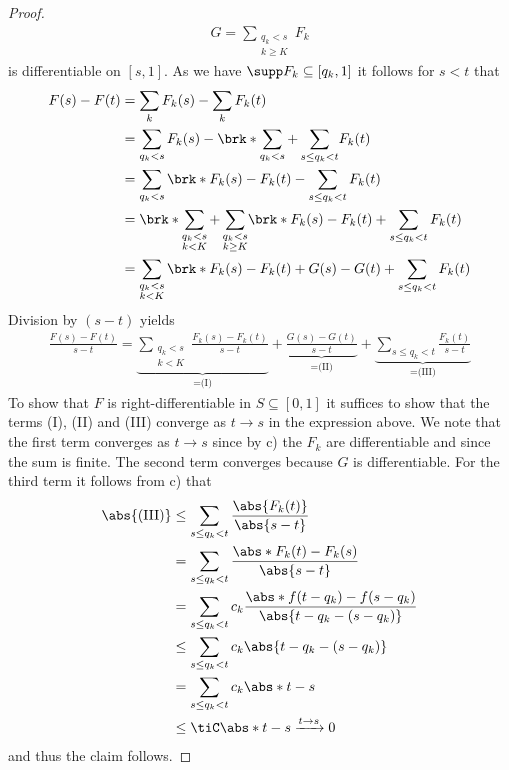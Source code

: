 \begin{proof}
\begin{align*}
	G=\sum_{\substack{q_k< s\\k\geq K}} F_k
\end{align*}
is differentiable on $[s,1]$.
As we have $\supp F_k\subseteq [q_k,1]$ it follows for $s< t$ that
\begin{align*}
	F(s)-F(t)
	&=\sum_kF_k(s)-\sum_kF_k(t) \\
	&=\sum_{q_k< s}F_k(s)-\brk*{\sum_{q_k<s}+\sum_{s\leq q_k <t}}F_k(t) \\
	&=\sum_{q_k< s}\brk*{F_k(s)-F_k(t)}-\sum_{s\leq q_k <t}F_k(t) \\
	&=\brk*{\sum_{\substack{q_k< s\\k< K}}+\sum_{\substack{q_k< s\\k\geq K}}}\brk*{F_k(s)-F_k(t)}+\sum_{s\leq q_k <t}F_k(t) \\
	&=\sum_{\substack{q_k< s\\k< K}}\brk*{F_k(s)-F_k(t)}+G(s)-G(t)+\sum_{s\leq q_k <t}F_k(t) \\
\end{align*}
Division by $(s-t)$ yields
\begin{align*}
	\frac{F(s)-F(t)}{s-t}
	=\underbrace{\sum_{\substack{q_k< s\\k< K}}\frac{F_k(s)-F_k(t)}{s-t}}_{=\text{(I)}}+\underbrace{\frac{G(s)-G(t)}{s-t}}_{=\text{(II)}}+\underbrace{\sum_{s\leq q_k <t}\frac{F_k(t)}{s-t}}_{=\text{(III)}}
\end{align*}
To show that $F$ is right-differentiable in $S\subseteq[0,1]$ it suffices to show that the terms (I), (II) and (III) converge as $t\to s$ in the expression above. 
We note that the first term converges as $t\to s$ since by c) the $F_k$ are differentiable and since the sum is finite.
The second term converges because $G$ is differentiable.
For the third term it follows from c) that
\begin{align*}
	\abs{\text{(III)}}&\leq\sum_{s\leq q_k <t}\frac{\abs{F_k(t)}}{\abs{s-t}} \\
	&=\sum_{s\leq q_k <t}\frac{\abs*{F_k(t)-F_k(s)}}{\abs{s-t}} \\
	&=\sum_{s\leq q_k <t}c_k\frac{\abs*{f(t-q_k)-f(s-q_k)}}{\abs{t-q_k-(s-q_k)}}	 \\
	&\leq\sum_{s\leq q_k <t}c_k\abs{t-q_k-(s-q_k)} \\
	&=\sum_{s\leq q_k <t}c_k\abs*{t-s} \\
	&\leq\tiC \abs*{t-s}\xrightarrow{t\to s}0
\end{align*}
and thus the claim follows.
\end{proof}

